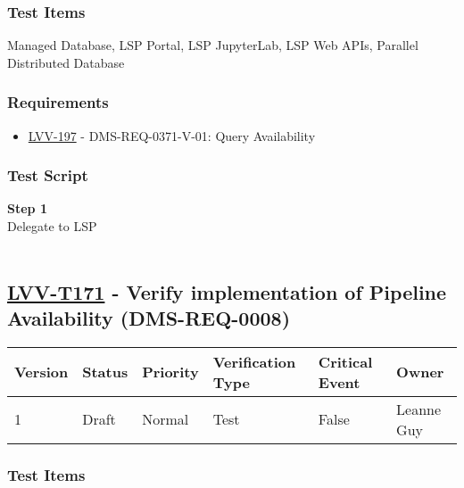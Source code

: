\hypertarget{test-items-146}{%
\subsubsection{Test Items}\label{test-items-146}}

Managed Database, LSP Portal, LSP JupyterLab, LSP Web APIs, Parallel
Distributed Database~

\hypertarget{requirements-147}{%
\subsubsection{Requirements}\label{requirements-147}}

\begin{itemize}
\tightlist
\item
  \href{https://jira.lsstcorp.org/browse/LVV-197}{LVV-197} -
  DMS-REQ-0371-V-01: Query Availability
\end{itemize}

\hypertarget{test-script-147}{%
\subsubsection{Test Script}\label{test-script-147}}

\textbf{Step 1}\\
Delegate to LSP\\
~\\

\hypertarget{lvv-t171---verify-implementation-of-pipeline-availability-dms-req-0008}{%
\subsection{\texorpdfstring{\href{https://jira.lsstcorp.org/secure/Tests.jspa\#/testCase/LVV-T171}{LVV-T171}
- Verify implementation of Pipeline Availability
(DMS-REQ-0008)}{LVV-T171 - Verify implementation of Pipeline Availability (DMS-REQ-0008)}}\label{lvv-t171---verify-implementation-of-pipeline-availability-dms-req-0008}}

\begin{longtable}[]{@{}llllll@{}}
\toprule
Version & Status & Priority & Verification Type & Critical Event &
Owner\tabularnewline
\midrule
\endhead
1 & Draft & Normal & Test & False & Leanne Guy\tabularnewline
\bottomrule
\end{longtable}

\hypertarget{test-items-147}{%
\subsubsection{Test Items}\label{test-items-147}}

